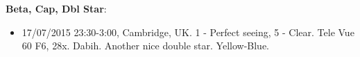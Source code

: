 {\bf Beta, Cap, Dbl Star}:
\begin{itemize}
\item 17/07/2015 23:30-3:00, Cambridge, UK. 1 - Perfect seeing, 5 - Clear. Tele Vue 60 F6, 28x. Dabih. Another nice double star. Yellow-Blue.
\end{itemize}

